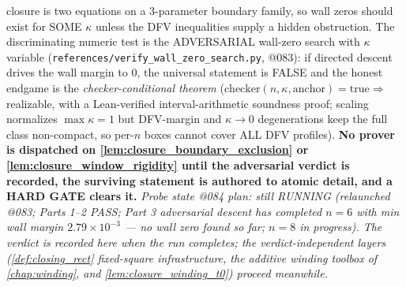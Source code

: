closure is two equations on a $3$-parameter boundary family, so wall zeros
should exist for SOME $\kappa$ unless the DFV inequalities supply a hidden
obstruction. The discriminating numeric test is the ADVERSARIAL wall-zero
search with $\kappa$ variable
(\texttt{references/verify\_wall\_zero\_search.py}, @083): if directed descent
drives the wall margin to $0$, the universal statement is FALSE and the honest
endgame is the \emph{checker-conditional theorem} ($\mathrm{checker}(n, \kappa,
\text{anchor}) = \mathrm{true} \Rightarrow$ realizable, with a Lean-verified
interval-arithmetic soundness proof; scaling normalizes $\max\kappa = 1$ but
DFV-margin and $\kappa \to 0$ degenerations keep the full class non-compact,
so per-$n$ boxes cannot cover ALL DFV profiles). \textbf{No prover is
dispatched on \cref{lem:closure_boundary_exclusion} or
\cref{lem:closure_window_rigidity} until the adversarial verdict is recorded,
the surviving statement is authored to atomic detail, and a HARD GATE clears
it.} \emph{Probe state @084 plan: still RUNNING (relaunched @083; Parts 1--2
PASS; Part 3 adversarial descent has completed $n = 6$ with min wall margin
$2.79\times10^{-3}$ --- no wall zero found so far; $n = 8$ in progress). The
verdict is recorded here when the run completes; the verdict-independent
layers (\cref{def:closing_rect} fixed-square infrastructure, the additive
winding toolbox of \cref{chap:winding}, and \cref{lem:closure_winding_t0})
proceed meanwhile.}

